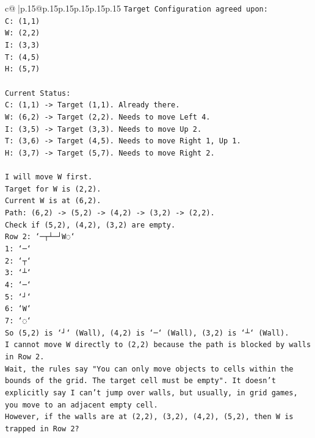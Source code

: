 \documentclass{article}
\begin{document}
{\begin{supertabular}{c@{$\;$}|p{.15\linewidth}@{}p{.15\linewidth}p{.15\linewidth}p{.15\linewidth}p{.15\linewidth}p{.15\linewidth}}
{{{\texttt{Target Configuration agreed upon:} \\
\texttt{C: (1,1)} \\
\texttt{W: (2,2)} \\
\texttt{I: (3,3)} \\
\texttt{T: (4,5)} \\
\texttt{H: (5,7)} \\
\\ 
\texttt{Current Status:} \\
\texttt{C: (1,1) {-}> Target (1,1). Already there.} \\
\texttt{W: (6,2) {-}> Target (2,2). Needs to move Left 4.} \\
\texttt{I: (3,5) {-}> Target (3,3). Needs to move Up 2.} \\
\texttt{T: (3,6) {-}> Target (4,5). Needs to move Right 1, Up 1.} \\
\texttt{H: (3,7) {-}> Target (5,7). Needs to move Right 2.} \\
\\ 
\texttt{I will move W first.} \\
\texttt{Target for W is (2,2).} \\
\texttt{Current W is at (6,2).} \\
\texttt{Path: (6,2) {-}> (5,2) {-}> (4,2) {-}> (3,2) {-}> (2,2).} \\
\texttt{Check if (5,2), (4,2), (3,2) are empty.} \\
\texttt{Row 2: `─┬┴─┘W◌`} \\
\texttt{1: `─`} \\
\texttt{2: `┬`} \\
\texttt{3: `┴`} \\
\texttt{4: `─`} \\
\texttt{5: `┘`} \\
\texttt{6: `W`} \\
\texttt{7: `◌`} \\
\texttt{So (5,2) is `┘` (Wall), (4,2) is `─` (Wall), (3,2) is `┴` (Wall).} \\
\texttt{I cannot move W directly to (2,2) because the path is blocked by walls in Row 2.} \\
\texttt{Wait, the rules say "You can only move objects to cells within the bounds of the grid. The target cell must be empty". It doesn't explicitly say I can't jump over walls, but usually, in grid games, you move to an adjacent empty cell.} \\
\texttt{However, if the walls are at (2,2), (3,2), (4,2), (5,2), then W is trapped in Row 2?} \\
}}}
\end{supertabular}}
\end{document}
